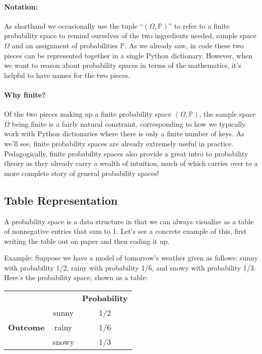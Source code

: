 \documentclass[6008notes.tex]{subfiles}
\begin{document}
 
\paragraph{Notation:} As shorthand we occasionally use the tuple ``$(\Omega ,\mathbb {P})$'' to refer to a finite probability space to remind ourselves of the two ingredients needed, sample space $\Omega$ and an assignment of probabilities $\mathbb {P}$. As we already saw, in code these two pieces can be represented together in a single Python dictionary. However, when we want to reason about probability spaces in terms of the mathematics, it's helpful to have names for the two pieces.

\paragraph{Why finite?} Of the two pieces making up a finite probability space $(\Omega ,\mathbb {P})$, the sample space $\Omega$ being finite is a fairly natural constraint, corresponding to how we typically work with Python dictionaries where there is only a finite number of keys. As we'll see, finite probability spaces are already extremely useful in practice. Pedagogically, finite probability spaces also provide a great intro to probability theory as they already carry a wealth of intuition, much of which carries over to a more complete story of general probability spaces!

\subsection{Table Representation}

A probability space is a data structure in that we can always visualize as a table of nonnegative entries that sum to 1. Let's see a concrete example of this, first writing the table out on paper and then coding it up.

Example: Suppose we have a model of tomorrow's weather given as follows: sunny with probability 1/2, rainy with probability 1/6, and snowy with probability 1/3. Here's the probability space, shown as a table:

\begin{center}
\begin{tabular}{c c c}
 & & \textbf{Probability} \\
 &	sunny	& 1/2 \\
\textbf{Outcome} &	rainy &	1/6 \\
 &	snowy	& 1/3
\end{tabular}
\end{center}
\end{document}
